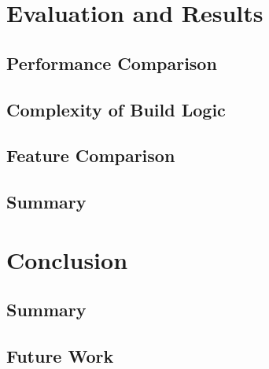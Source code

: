 \documentclass[12pt, a4paper, titlepage]{scrartcl}
\begin{document}
\section{Evaluation and Results}
\subsection{Performance Comparison}
\subsection{Complexity of Build Logic}
\subsection{Feature Comparison}
\subsection{Summary}

\section{Conclusion}
\subsection{Summary}
\subsection{Future Work}






\end{document}

